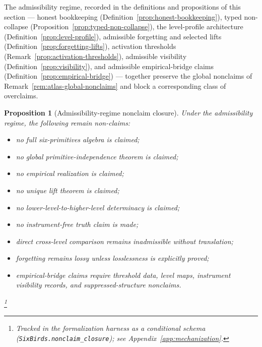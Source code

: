 \documentclass[11pt]{article}
\newtheorem{proposition}[theorem]{Proposition}
\theoremstyle{definition}
\begin{document}
The admissibility regime, recorded in the definitions and propositions
of this section --- honest bookkeeping
(Definition~\ref{prop:honest-bookkeeping}), typed non-collapse
(Proposition~\ref{prop:typed-non-collapse}), the level-profile
architecture (Definition~\ref{prop:level-profile}), admissible
forgetting and selected lifts (Definition~\ref{prop:forgetting-lifts}),
activation thresholds (Remark~\ref{prop:activation-thresholds}),
admissible visibility (Definition~\ref{prop:visibility}), and
admissible empirical-bridge claims (Definition~\ref{prop:empirical-bridge})
--- together preserve the global nonclaims of
Remark~\ref{rem:atlas-global-nonclaims} and block a corresponding
class of overclaims.

\begin{proposition}[Admissibility-regime nonclaim closure]\label{prop:nonclaim-closure}
Under the admissibility regime, the following remain non-claims:
\begin{itemize}[topsep=2pt,itemsep=1pt]
  \item no full six-primitives algebra is claimed;
  \item no global primitive-independence theorem is claimed;
  \item no empirical realization is claimed;
  \item no unique lift theorem is claimed;
  \item no lower-level-to-higher-level determinacy is claimed;
  \item no instrument-free truth claim is made;
  \item direct cross-level comparison remains inadmissible without
    translation;
  \item forgetting remains lossy unless losslessness is explicitly proved;
  \item empirical-bridge claims require threshold data, level maps,
    instrument visibility records, and suppressed-structure nonclaims.
\end{itemize}\footnote{Tracked in the formalization harness as a conditional schema (\texttt{SixBirds.nonclaim\_closure}); see Appendix~\ref{app:mechanization}.}
\end{proposition}
\end{document}
